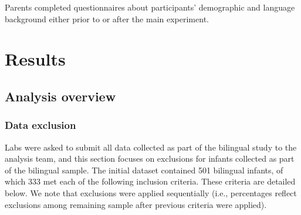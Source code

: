 \documentclass[,man,floatsintext]{apa6}
\begin{document}
Parents completed questionnaires about participants' demographic and language background either prior to or after the main experiment.

\hypertarget{results}{%
\section{Results}\label{results}}

\hypertarget{analysis-overview}{%
\subsection{Analysis overview}\label{analysis-overview}}

\hypertarget{data-exclusion}{%
\subsubsection{Data exclusion}\label{data-exclusion}}

Labs were asked to submit all data collected as part of the bilingual study to the analysis team, and this section focuses on exclusions for infants collected as part of the bilingual sample. The initial dataset contained 501 bilingual infants, of which 333 met each of the following inclusion criteria. These criteria are detailed below. We note that exclusions were applied sequentially (i.e., percentages reflect exclusions among remaining sample after previous criteria were applied).
\end{document}
